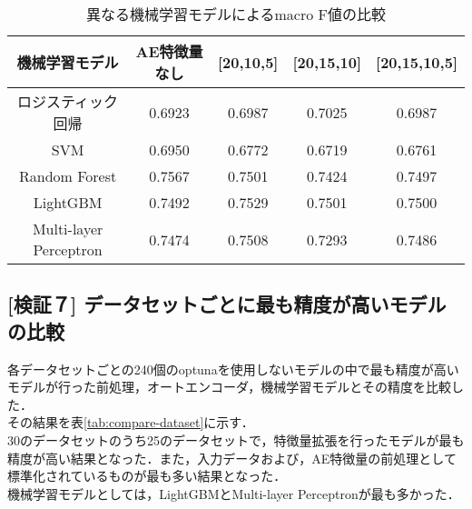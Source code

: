 \begin{table}[htbp]
    \caption{異なる機械学習モデルによるmacro F値の比較}
    \label{tab:compare-model}
    \centering
    \begin{tabular}{ccccc}
        \hline
        機械学習モデル& AE特徴量なし & [20,10,5] & [20,15,10]& [20,15,10,5] \\ 
        \hline
        ロジスティック回帰  & 0.6923& 0.6987&  0.7025& 0.6987\\
        SVM & 0.6950& 0.6772& 0.6719& 0.6761\\
        Random Forest & 0.7567& 0.7501& 0.7424&  0.7497\\
        LightGBM & 0.7492& 0.7529& 0.7501& 0.7500\\
        Multi-layer Perceptron & 0.7474& 0.7508&  0.7293& 0.7486\\
        \hline
    \end{tabular}
\end{table}

\subsection{[検証７] データセットごとに最も精度が高いモデルの比較}
各データセットごとの240個のoptunaを使用しないモデルの中で最も精度が高いモデルが行った前処理，オートエンコーダ，機械学習モデルとその精度を比較した．\\
その結果を表\ref{tab:compare-dataset}に示す．\\
30のデータセットのうち25のデータセットで，特徴量拡張を行ったモデルが最も精度が高い結果となった．また，入力データおよび，AE特徴量の前処理として標準化されているものが最も多い結果となった．\\
機械学習モデルとしては，LightGBMとMulti-layer Perceptronが最も多かった．\\

